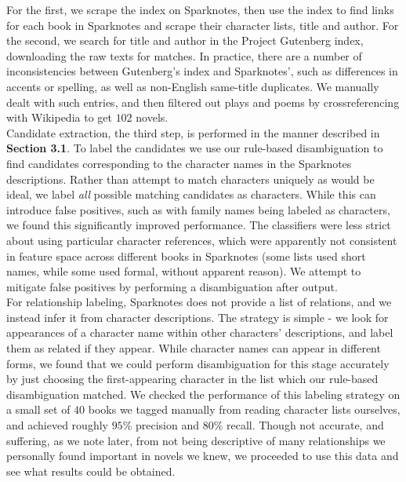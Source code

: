 \documentclass[12pt]{article}
\begin{document}
        For the first, we scrape the index on Sparknotes, then use the index to find links for each
        book in Sparknotes and scrape their character lists, title and author. For the second, we
        search for title and author in the Project Gutenberg index, downloading the raw texts for
        matches. In practice, there are a number of inconsistencies between Gutenberg's index and
        Sparknotes', such as differences in accents or spelling, as well as non-English same-title
        duplicates. We manually dealt with such entries, and then filtered out plays and poems
        by crossreferencing with Wikipedia to get $102$ novels. \\

        Candidate extraction, the third step, is performed in the manner described in \textbf{Section 3.1}. 
        To label the candidates we use our rule-based disambiguation to find candidates corresponding
        to the character names in the Sparknotes descriptions. Rather than attempt to match characters
        uniquely as would be ideal, we label \emph{all} possible matching candidates as
        characters. While this can introduce false positives, such as with family names being labeled
        as characters, we found this significantly improved performance. The classifiers were less strict
        about using particular character references, which were apparently not consistent in feature
        space across different books in Sparknotes (some lists used short names, while some used formal,
        without apparent reason). We attempt to mitigate false positives by performing a disambiguation
        after output. \\ 

        For relationship labeling, Sparknotes does not provide a list of relations, and we instead
        infer it from character descriptions. The strategy is simple - we look for appearances
        of a character name within other characters' descriptions, and label them as related if
        they appear. While character names can appear in different forms, we found that we could
        perform disambiguation for this stage accurately by just choosing the first-appearing 
        character in the list which our rule-based disambiguation matched. We checked the performance
        of this labeling strategy on a small set of $40$ books we tagged manually from reading 
        character lists ourselves, and achieved roughly $95\%$ precision and $80\%$ recall. Though not
        accurate, and suffering, as we note later, from not being descriptive of many relationships
        we personally found important in novels we knew, we proceeded to use this data and 
        see what results could be obtained.
\end{document}
